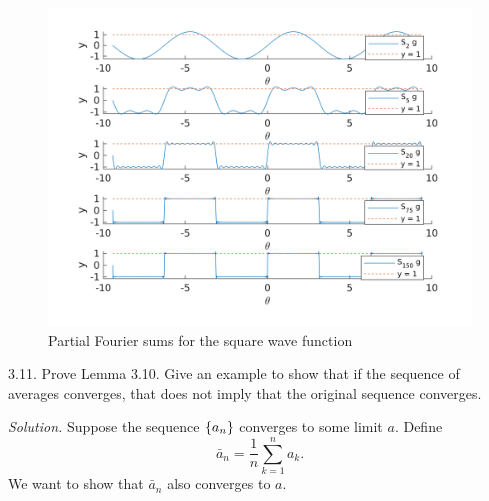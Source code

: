 \documentclass{article}
\begin{document}
\begin{figure}[hbtp]
    \includegraphics[width=\textwidth]{q31b}
    \centering
    \caption{Partial Fourier sums for the square wave function}
    \label{fig:3-1-b}
\end{figure}

\newpage



\newpage

3.11. Prove Lemma 3.10. Give an example to show that if the sequence of
  averages converges, that does not imply that the original sequence
  converges.

\textit{Solution.}
Suppose the sequence $\cbr{a_n}$ converges to some limit $a$. Define
%
\begin{equation*}
    \bar{a}_n = \frac{1}{n} \sum_{k = 1}^n a_k
    .
\end{equation*}
%
We want to show that $\bar{a}_n$ also converges to $a$.
\end{document}
